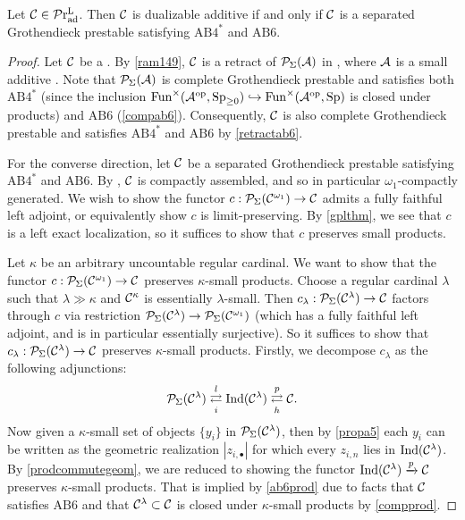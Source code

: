 \documentclass[a4paper,10pt, oneside]{amsart}
\begin{document}
	\begin{thm}\label{main1}
		Let $\mathcal{C}\in\mathcal{P}\mathrm{r}_{\mathrm{ad}}^\mathrm{L}$. Then $\mathcal{C}$ is dualizable additive if and only if $\mathcal{C}$ is a separated Grothendieck prestable \infcat satisfying $\mathrm{AB4}^*$ and $\mathrm{AB6}$.
	\end{thm}
	\begin{proof}
		Let $\mathcal{C}$ be a \dualaddinfcat. By \cref{ram149}, $\mathcal{C}$ is a retract of $\mathcal{P}_\Sigma(\mathcal{A})$ in \prlad, where $\mathcal{A}$ is a small additive \infcat. Note that $\mathcal{P}_\Sigma(\mathcal{A})$ is complete Grothendieck prestable and satisfies both $\mathrm{AB4}^*$ (since the inclusion $\operatorname{Fun}^\times(\mathcal{A}^{\mathrm{op}},\operatorname{Sp}_{\geq0}) \hookrightarrow \operatorname{Fun}^\times(\mathcal{A}^{\mathrm{op}},\mathrm{Sp})$ is closed under products) and $\mathrm{AB6}$ (\cref{compab6}). Consequently, $\mathcal{C}$ is also complete Grothendieck prestable and satisfies $\mathrm{AB4}^*$ and $\mathrm{AB6}$ by \cref{retractab6}.
		
		For the converse direction, let $\mathcal{C}$ be a separated Grothendieck prestable
		 \infcat satisfying $\mathrm{AB4}^*$ and $\mathrm{AB6}$. By \cite[Remark 1.54]{efimov2024k}, $\mathcal{C}$ is compactly
		 assembled, and so in particular $\omega_1$-compactly generated.
		 We wish to show the functor
		  $c:\mathcal{P}_\Sigma(\mathcal{C}^{\omega_1})\to\mathcal{C}$ admits a fully faithful left adjoint, 
		  or equivalently show $c$ is limit-preserving. By \cref{gplthm}, we see that 
		  $c$ is a left exact localization, so it suffices to show that $c$ preserves small products.
		
		Let $\kappa$ be an arbitrary uncountable regular cardinal. We want to show that 
		the functor $c:\mathcal{P}_\Sigma(\mathcal{C}^{\omega_1})\to\mathcal{C}$ preserves $\kappa$-small products.
		 Choose a regular cardinal $\lambda$ such that $\lambda\gg  \kappa$ and $\mathcal{C}^\kappa$
		is essentially $\lambda$-small. Then $c_\lambda:\mathcal{P}_\Sigma(\mathcal{C}^{\lambda})\to\mathcal{C}$ factors through $c$ via restriction $\mathcal{P}_\Sigma(\mathcal{C}^{\lambda})\to\mathcal{P}_\Sigma(\mathcal{C}^{\omega_1})$ (which has a fully faithful left adjoint, and is in particular essentially surjective). So it suffices to show that $c_\lambda:\mathcal{P}_\Sigma(\mathcal{C}^{\lambda})\to\mathcal{C}$ preserves $\kappa$-small products. Firstly, we decompose $c_\lambda$ as the following adjunctions:
		$$\mathcal{P}_\Sigma(\mathcal{C}^{\lambda})\underset{i}{\stackrel{l}{\rightleftarrows}}\mathrm{Ind}(\mathcal{C}^{\lambda})\underset{h}{\stackrel{p}{\rightleftarrows}}\mathcal{C} .$$
		Now given a $\kappa$-small set of objects $\{y_i\}$ in $\mathcal{P}_\Sigma(\mathcal{C}^{\lambda})$, then by \cref{propa5} each $y_i$ can be written as the geometric realization $|z_{i,\bullet}|$ for which every $z_{i,n}$ lies in $\mathrm{Ind}(\mathcal{C}^{\lambda})$. By \cref{prodcommutegeom}, we are reduced to showing the functor $\mathrm{Ind}(\mathcal{C}^{\lambda})\xrightarrow{p}\mathcal{C}$ preserves $\kappa$-small products. That is implied by \cref{ab6prod} due to facts that $\mathcal{C}$ satisfies $\mathrm{AB6}$ and that $\mathcal{C}^\lambda\subset\mathcal{C}$ is closed under $\kappa$-small products by \cref{compprod}.
	\end{proof}
\end{document}
